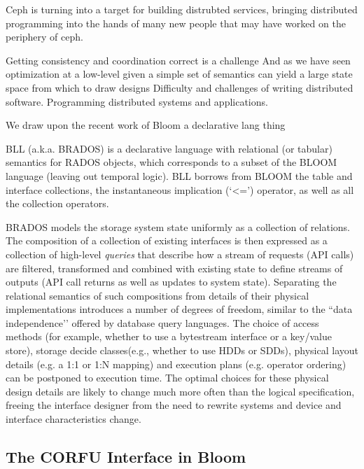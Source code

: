 \documentclass[10pt,twocolumn]{article}
\begin{document}
Ceph is turning into a target for building distrubted services, bringing
distributed programming into the hands of many new people that may have
worked on the periphery of ceph.

Getting consistency and coordination correct is a challenge And as we have seen
optimization at a low-level given a simple set of semantics can yield a large
state space from which to draw designs Difficulty and challenges of writing
distributed software.  Programming distributed systems and applications.

We draw upon the recent work of Bloom a declarative lang thing

BLL (a.k.a. BRADOS) is a declarative language with relational (or tabular)
semantics for RADOS objects, which corresponds to a subset of the BLOOM
language (leaving out temporal logic). BLL borrows from BLOOM the table and
interface collections, the instantaneous implication (‘<=’) operator, as well
as all the collection operators.

BRADOS models the storage system state uniformly as a collection of relations.
The composition of a collection of existing interfaces is then expressed as a
collection of high-level \emph{queries} that describe how a stream of requests
(API calls) are filtered, transformed and combined with existing state to
define streams of outputs (API call returns as well as updates to system
state).  Separating the relational semantics of such compositions from details
of their physical implementations introduces a number of degrees of freedom,
similar to the ``data independence’’ offered by database query languages.  The
choice of access methods (for example, whether to use a bytestream interface or
a key/value store), storage decide classes(e.g., whether to use HDDs or SDDs),
physical layout details (e.g. a 1:1 or 1:N mapping) and execution plans (e.g.
operator ordering) can be postponed to execution time.  The optimal choices for
these physical design details are likely to change much more often than the
logical specification, freeing the interface designer from the need to rewrite
systems and device and interface characteristics change.  

\subsection{The CORFU Interface in Bloom}
\end{document}
